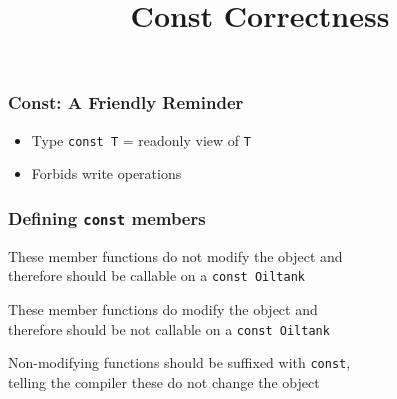 
\usetikzlibrary{shadows,shapes.multipart}

\title{Const Correctness}




\begin{frame}
  \titlepage
\end{frame}

\begin{frame}
  \frametitle{Const: A Friendly Reminder}
  \begin{itemize}
    \item Type {\tt const T} = readonly view of {\tt T}
    \item Forbids write operations
  \end{itemize}
  \vskip5mm
  \begin{overprint}

  \end{overprint}
  \vskip5mm
\end{frame}

\begin{frame}
  \frametitle{Defining {\tt const} members}
  \begin{overprint}
    \begin{center}
      These member functions do not modify the object
      and \\ therefore should be callable on a \texttt{const Oiltank}
    \end{center}

    \begin{center}
      These member functions do modify the object
      and \\ therefore should be not callable on a \texttt{const Oiltank}
    \end{center}

    \begin{center}
      Non-modifying functions should be suffixed with \texttt{const},\\
      telling the compiler these do not change the object
    \end{center}
  \end{overprint}
\end{frame}

